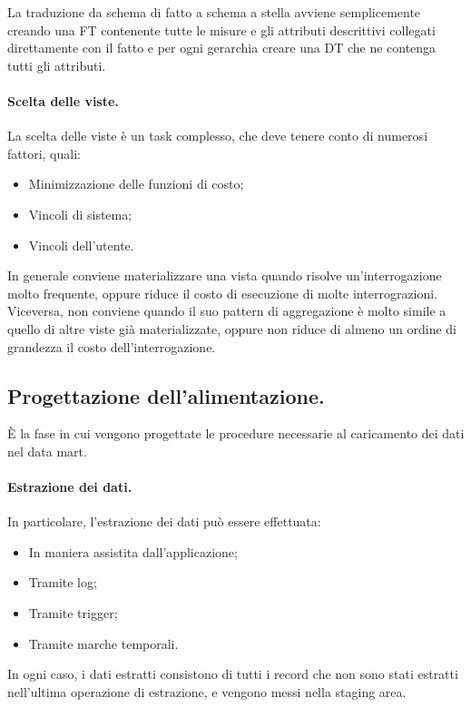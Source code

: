 \documentclass[a4paper, 10pt]{article}
\begin{document}
	La traduzione da schema di fatto a schema a stella avviene semplicemente creando una FT contenente tutte le misure e gli attributi descrittivi collegati direttamente con il fatto e per ogni gerarchia creare una DT che ne contenga tutti gli attributi.
	
	\paragraph{Scelta delle viste.} La scelta delle viste è un task complesso, che deve tenere conto di numerosi fattori, quali:\begin{itemize}
		\item Minimizzazione delle funzioni di costo;
		\item Vincoli di sistema;
		\item Vincoli dell'utente.
	\end{itemize}

	In generale conviene materializzare una vista quando risolve un'interrogazione molto frequente, oppure riduce il costo di esecuzione di molte interrograzioni. Viceversa, non conviene quando il suo pattern di aggregazione è molto simile a quello di altre viste già materializzate, oppure non riduce di almeno un ordine di grandezza il costo dell'interrogazione.
	
	\subsection{Progettazione dell'alimentazione.} È la fase in cui vengono progettate le procedure necessarie al caricamento dei dati nel data mart. 
	
	\paragraph{Estrazione dei dati.} In particolare, l'estrazione dei dati può essere effettuata: \begin{itemize}
		\item In maniera assistita dall'applicazione;
		\item Tramite log;
		\item Tramite trigger;
		\item Tramite marche temporali.
	\end{itemize}
	
	In ogni caso, i dati estratti consistono di tutti i record che non sono stati estratti nell'ultima operazione di estrazione, e vengono messi nella staging area.
	
\end{document}
